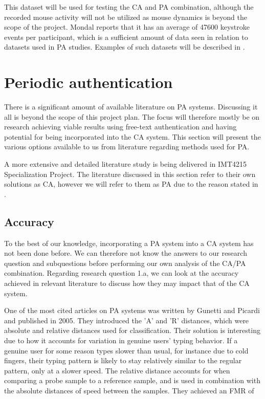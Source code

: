 \documentclass[informationsecurity]{gucmasterproject}
\begin{document}
This dataset will be used for testing the CA and PA combination, although the recorded mouse activity will not be utilized as mouse dynamics is beyond the scope of the project.
Mondal reports that it has an average of 47600 keystroke events per participant, which is a sufficient amount of data seen in relation to datasets used in PA studies.
Examples of such datasets will be described in .


\section{Periodic authentication}
\label{sec:related-other}
There is a significant amount of available literature on PA systems.
Discussing it all is beyond the scope of this project plan. The focus will therefore mostly be on research achieving viable results using free-text authentication and having potential for being incorporated into the CA system.
This section will present the various options available to us from literature regarding methods used for PA.

A more extensive and detailed literature study is being delivered in IMT4215 Specialization Project.
The literature discussed in this section refer to their own solutions as CA, however we will refer to them as PA due to the reason stated in .

\subsection{Accuracy}
To the best of our knowledge, incorporating a PA system into a CA system has not been done before. 
We can therefore not know the answers to our research question and subquestions before performing our own analysis of the CA/PA combination.
Regarding research question 1.a, we can look at the accuracy achieved in relevant literature to discuss how they may impact that of the CA system.

One of the most cited articles on PA systems was written by Gunetti and Picardi \cite{gunettiPicardi} and published in 2005.
They introduced the 'A' and 'R' distances, which were absolute and relative distances used for classification.
Their solution is interesting due to how it accounts for variation in genuine users' typing behavior.
If a genuine user for some reason types slower than usual, for instance due to cold fingers, their typing pattern is likely to stay relatively similar to the regular pattern, only at a slower speed.
The relative distance accounts for when comparing a probe sample to a reference sample, and is used in combination with the absolute distances of speed between the samples.
They achieved an FMR of 
\end{document}
